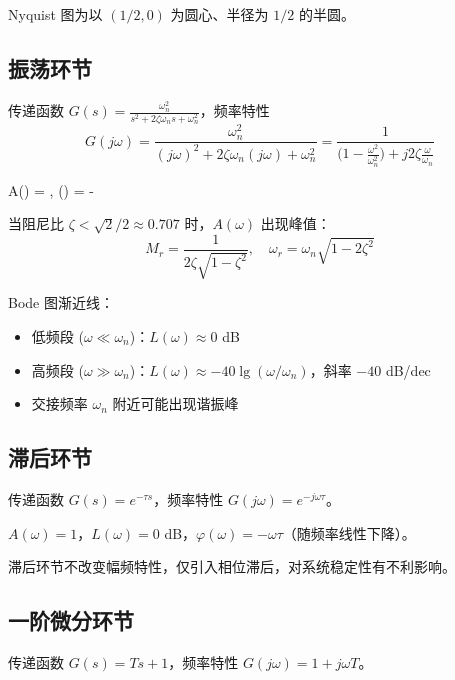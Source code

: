 Nyquist 图为以 $(1/2, 0)$ 为圆心、半径为 $1/2$ 的半圆。

\subsection{振荡环节}

传递函数 $G(s) = \frac{\omega_n^2}{s^2 + 2\zeta\omega_n s + \omega_n^2}$，频率特性
\[
G(j\omega) = \frac{\omega_n^2}{(j\omega)^2 + 2\zeta\omega_n(j\omega) + \omega_n^2} = \frac{1}{\bigl(1 - \frac{\omega^2}{\omega_n^2}\bigr) + j2\zeta\frac{\omega}{\omega_n}}
\]

\begin{myformula}
A(\omega) = ,\quad
\varphi(\omega) = -\arctan{}
\end{myformula}

当阻尼比 $\zeta < \sqrt{2}/2 \approx 0.707$ 时，$A(\omega)$ 出现峰值：
\[
M_r = \frac{1}{2\zeta\sqrt{1-\zeta^2}},\quad \omega_r = \omega_n\sqrt{1-2\zeta^2}
\]

Bode 图渐近线：
\begin{itemize}
    \item 低频段 ($\omega \ll \omega_n$)：$L(\omega) \approx 0$ dB
    \item 高频段 ($\omega \gg \omega_n$)：$L(\omega) \approx -40\lg(\omega/\omega_n)$，斜率 $-40$ dB/dec
    \item 交接频率 $\omega_n$ 附近可能出现谐振峰
\end{itemize}

\subsection{滞后环节}

传递函数 $G(s) = e^{-\tau s}$，频率特性 $G(j\omega) = e^{-j\omega\tau}$。

$A(\omega) = 1$，$L(\omega) = 0$ dB，$\varphi(\omega) = -\omega\tau$（随频率线性下降）。

滞后环节不改变幅频特性，仅引入相位滞后，对系统稳定性有不利影响。

\subsection{一阶微分环节}

传递函数 $G(s) = Ts + 1$，频率特性 $G(j\omega) = 1 + j\omega T$。

